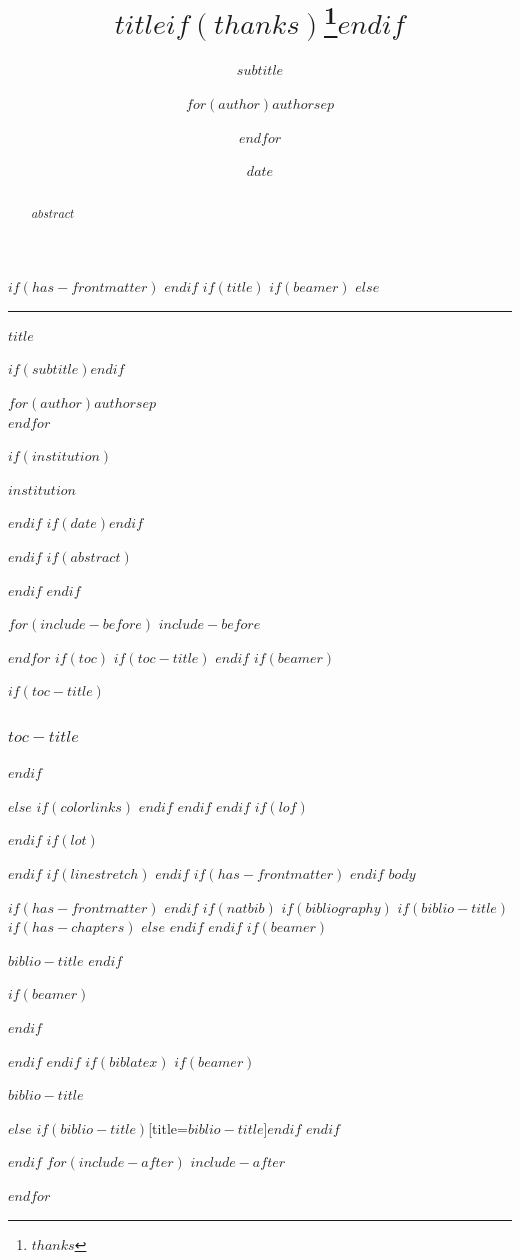 \documentclass[
$if(fontsize)$
  $fontsize$,
$endif$
$if(papersize)$
  $papersize$paper,
$endif$
$if(beamer)$
  ignorenonframetext,
$if(handout)$
  handout,
$endif$
$if(aspectratio)$
  aspectratio=$aspectratio$,
$endif$
$endif$
$for(classoption)$
  $classoption$$sep$,
$endfor$
]{$documentclass$}
\title{$title$$if(thanks)$\thanks{$thanks$}$endif$}
\subtitle{$subtitle$}
\author{$for(author)$$author$$sep$ \and $endfor$}
\date{$date$}
\institute{$for(institute)$$institute$$sep$ \and $endfor$}
\newif\ifbibliography
\begin{document}
$if(has-frontmatter)$
\frontmatter
$endif$
$if(title)$
$if(beamer)$
\frame{\titlepage}
$else$
\begin{titlepage}
  \centering
  \vspace*{2.4cm}
  {\color{sgpazul}\rule{\textwidth}{1.2pt}}\par\vspace{1.5cm}
  {\Huge\bfseries\color{sgpazul} $title$\par}
  $if(subtitle)$\vspace{0.6cm}{\Large $subtitle$\par}$endif$
  \vspace{1.5cm}
  {\large $for(author)$$author$$sep$\\[0.25cm]$endfor$\par}
  \vfill
  $if(institution)$ {\large $institution$\par}$endif$
  $if(date)$\vspace{0.4cm}{\large $date$\par}$endif$
  \vspace*{1.5cm}{\color{sgpazul}\rule{\textwidth}{1.2pt}}\par
\end{titlepage}
$endif$
$if(abstract)$
\begin{abstract}
$abstract$
\end{abstract}
$endif$
$endif$

$for(include-before)$
$include-before$

$endfor$
$if(toc)$
$if(toc-title)$
\renewcommand*\contentsname{$toc-title$}
$endif$
$if(beamer)$
\begin{frame}[allowframebreaks]
$if(toc-title)$
  \frametitle{$toc-title$}
$endif$
  \tableofcontents[hideallsubsections]
\end{frame}
$else$
{
$if(colorlinks)$
\hypersetup{linkcolor=$if(toccolor)$$toccolor$$else$$endif$}
$endif$
\setcounter{tocdepth}{$toc-depth$}
\tableofcontents
}
\clearpage
{}
$endif$
$endif$
$if(lof)$
\listoffigures
$endif$
$if(lot)$
\listoftables
$endif$
$if(linestretch)$
$endif$
$if(has-frontmatter)$
\mainmatter
$endif$
$body$

$if(has-frontmatter)$
\backmatter
$endif$
$if(natbib)$
$if(bibliography)$
$if(biblio-title)$
$if(has-chapters)$
\renewcommand\bibname{$biblio-title$}
$else$
\renewcommand\refname{$biblio-title$}
$endif$
$endif$
$if(beamer)$
\begin{frame}[allowframebreaks]{$biblio-title$}
  \bibliographytrue
$endif$
  
$if(beamer)$
\end{frame}
$endif$

$endif$
$endif$
$if(biblatex)$
$if(beamer)$
\begin{frame}[allowframebreaks]{$biblio-title$}
  \bibliographytrue
  \printbibliography[heading=none]
\end{frame}
$else$
\printbibliography$if(biblio-title)$[title=$biblio-title$]$endif$
$endif$

$endif$
$for(include-after)$
$include-after$

$endfor$
\end{document}
